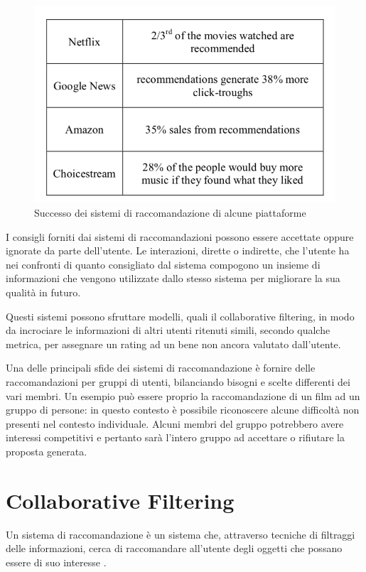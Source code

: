 \documentclass[letterpaper]{article}
\begin{document}
\begin{figure}[!htb]
    \begin{centering}
        \includegraphics[width=\linewidth]{Figures/successo.png}
        \caption{Successo dei sistemi di raccomandazione di alcune piattaforme \cite{ref1}}
        \label{fig:successo}
    \end{centering}
\end{figure}

I consigli forniti dai sistemi di raccomandazioni possono essere accettate oppure ignorate da parte dell'utente. Le interazioni, dirette o indirette, che l'utente ha nei confronti di quanto consigliato dal sistema compogono un insieme di informazioni che vengono utilizzate dallo stesso sistema per migliorare la sua qualità in futuro.

Questi sistemi possono sfruttare modelli, quali il collaborative filtering, in modo da incrociare le informazioni di altri utenti ritenuti simili, secondo qualche metrica, per assegnare un rating ad un bene non ancora valutato dall'utente.

Una delle principali sfide dei sistemi di raccomandazione è fornire delle raccomandazioni per gruppi di utenti, bilanciando bisogni e scelte differenti dei vari membri. Un esempio può essere proprio la raccomandazione di un film ad un gruppo di persone: in questo contesto è possibile riconoscere alcune difficoltà non presenti nel contesto individuale. Alcuni membri del gruppo potrebbero avere interessi competitivi e pertanto sarà l'intero gruppo ad accettare o rifiutare la proposta generata.

\section{Collaborative Filtering}
Un sistema di raccomandazione è un sistema che, attraverso tecniche di filtraggi delle informazioni, cerca di raccomandare all'utente degli oggetti che possano essere di suo interesse \cite{ref2}. 
\end{document}
